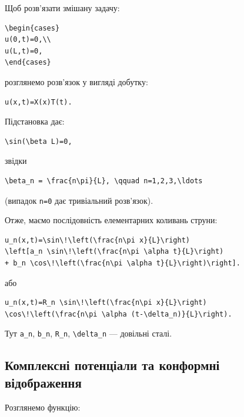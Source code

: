 \documentclass[
  ukrainian,
]{article}
\begin{document}
Щоб розв'язати змішану задачу:

\begin{verbatim}
\begin{cases}
u(0,t)=0,\\
u(L,t)=0,
\end{cases}
\end{verbatim}

розглянемо розв'язок у вигляді добутку:

\begin{verbatim}
u(x,t)=X(x)T(t).
\end{verbatim}

Підстановка дає:

\begin{verbatim}
\sin(\beta L)=0,
\end{verbatim}

звідки

\begin{verbatim}
\beta_n = \frac{n\pi}{L}, \qquad n=1,2,3,\ldots
\end{verbatim}

(випадок \texttt{n=0} дає тривіальний розв'язок).

Отже, маємо послідовність елементарних коливань струни:

\begin{verbatim}
u_n(x,t)=\sin\!\left(\frac{n\pi x}{L}\right)
\left[a_n \sin\!\left(\frac{n\pi \alpha t}{L}\right)
+ b_n \cos\!\left(\frac{n\pi \alpha t}{L}\right)\right].
\end{verbatim}

або

\begin{verbatim}
u_n(x,t)=R_n \sin\!\left(\frac{n\pi x}{L}\right)
\cos\!\left(\frac{n\pi \alpha (t-\delta_n)}{L}\right).
\end{verbatim}

Тут \texttt{a\_n}, \texttt{b\_n}, \texttt{R\_n},
\texttt{\textbackslash{}delta\_n} --- довільні сталі.

\subsection{Комплексні потенціали та конформні
відображення}\label{ux43aux43eux43cux43fux43bux435ux43aux441ux43dux456-ux43fux43eux442ux435ux43dux446ux456ux430ux43bux438-ux442ux430-ux43aux43eux43dux444ux43eux440ux43cux43dux456-ux432ux456ux434ux43eux431ux440ux430ux436ux435ux43dux43dux44f}

Розглянемо функцію:
\end{document}

